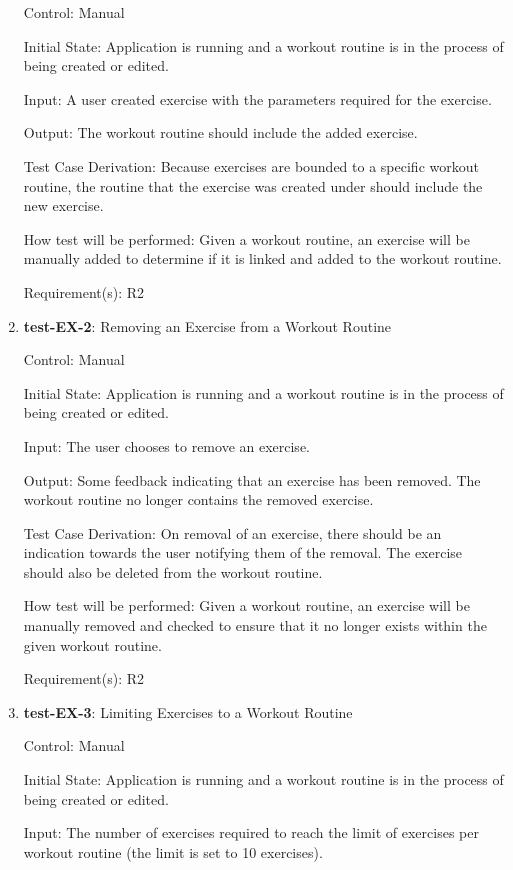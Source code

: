\documentclass[12pt, titlepage]{article}
\begin{document}
\begin{enumerate}
		Control: Manual
		
		Initial State: Application is running and a workout routine is in the process of being created or edited.
		
		Input: A user created exercise with the parameters required for the exercise.
		
		Output: The workout routine should include the added exercise.
		
		Test Case Derivation: Because exercises are bounded to a specific workout routine, the routine that the exercise was created under should include the new exercise.
		
		How test will be performed: Given a workout routine, an exercise will be manually added to determine if it is linked and added to the workout routine.
		
		Requirement(s): R2
		
		
		\item{\textbf{test-EX-2}}: Removing an Exercise from a Workout Routine
		
		Control: Manual
		
		Initial State: Application is running and a workout routine is in the process of being created or edited.
		
		Input: The user chooses to remove an exercise.
		
		Output: Some feedback indicating that an exercise has been removed. The workout routine no longer contains the removed exercise.
		
		Test Case Derivation: On removal of an exercise, there should be an indication towards the user notifying them of the removal. The exercise should also be deleted from the workout routine.
		
		How test will be performed: Given a workout routine, an exercise will be manually removed and checked to ensure that it no longer exists within the given workout routine.
		
		Requirement(s): R2
		
		
		\item{\textbf{test-EX-3}}: Limiting Exercises to a Workout Routine
		
		Control: Manual
		
		Initial State: Application is running and a workout routine is in the process of being created or edited.
		
		Input: The number of exercises required to reach the limit of exercises per workout routine (the limit is set to 10 exercises). 
		

\end{enumerate}
\end{document}
